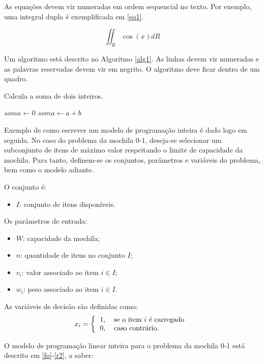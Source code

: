 \documentclass[a4paper,11pt,fleqn]{article}
\begin{document}
As equações devem vir numeradas em ordem sequencial no texto. Por exemplo, uma integral dupla é exemplificada em \ref{eq1}.

\begin{equation}
\label{eq1}
\iint_R \cos(x) dR
\end{equation}

Um algoritmo está descrito no Algoritmo \ref{alg1}. As linhas devem vir numeradas e as palavras reservadas devem vir em negrito. O algoritmo deve ficar dentro de um quadro.

\begin{algorithm}[h!]
\caption{Calcula a soma de dois inteiros. \label{alg1}}
$soma \gets 0$\;
$soma \gets a+b$\;
{
\;
}
\;
\end{algorithm}

Exemplo de como escrever um modelo de programação inteira é dado logo em seguida. No caso do problema da mochila 0-1, deseja-se selecionar um subconjunto de itens de máximo valor respeitando o limite de capacidade da mochila. Para tanto, definem-se os conjuntos, parâmetros e variáveis do problema, bem como o modelo adiante.

O conjunto é:
\begin{itemize}
\item $I$: conjunto de itens disponíveis.
\end{itemize}

Os parâmetros de entrada:
\begin{itemize}
\item $W$: capacidade da mochila;
\item $n$: quantidade de itens no conjunto $I$;
\item $v_i$: valor associado ao item $i \in I$;
\item $w_i$: peso associado ao item $i \in I$.
\end{itemize}

As variáveis de decisão são definidas como:
\begin{align*}
x_{i} = \left\{
\begin{tabular}{ll}
1, & se o item $i$ é carregado \\
0, & caso contrário.
\end{tabular}
\right.
\end{align*}

O modelo de programação linear inteira para o problema da mochila 0-1 está descrito em \eqref{fo}-\eqref{r2}, a saber:
\end{document}
